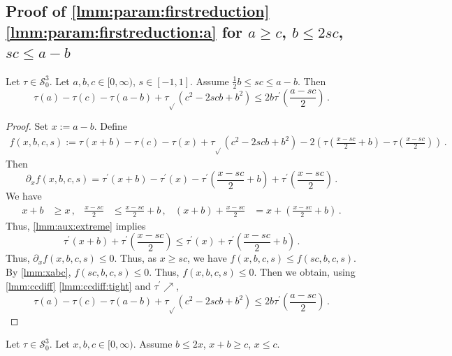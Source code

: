 \documentclass{article}
\newcommand{\lb}{\left(} %
\newcommand{\rb}{\right)} %
\newcommand{\br}[1]{\lb #1 \rb} %
\newcommand{\brOf}[1]{\!\br{#1}} %
\newcommand*{\mc}[1]{\mathcal{#1}}
\newcommand{\Rp}{[0, \infty)} %
\newcommand{\pr}{^\prime}
\newcommand{\equationFullstop}{\, .}
\newcommand{\eqfs}{\equationFullstop}
\newcommand{\equationComma}{\, ,}
\newcommand{\eqcm}{\equationComma}
\newcommand{\tran}{\tau}
\newcommand{\trans}{\tran_{\!\sqrt{}}}
\newcommand{\dtran}{\tran\pr}
\newcommand{\setccod}[1]{\mc S_0^{#1}}
\newcommand{\incr}{\nearrow}
\begin{document}
\begin{appendix}
\subsection{Proof of \cref{lmm:param:firstreduction} \ref{lmm:param:firstreduction:a} for $a \geq c$, $b \leq 2sc$, $sc \leq a-b$}\label{ssec:reduicLaGbscbLsc}
%
%
%
\begin{lemma}\label{lmm:param:reduicLaGbscbLsc}
	Let $\tran\in\setccod3$.
	Let $a,b,c\in\Rp$, $s\in[-1,1]$.
	Assume $\frac12 b \leq sc\leq a-b$.
	Then
	\begin{equation*}
		\tran(a) - \tran(c) - \tran(a-b) + \trans(c^2 - 2 s c b + b^2) \leq 2 b \dtran\brOf{\frac{a - s c}2}
		\eqfs
	\end{equation*}
\end{lemma}
%
\begin{proof}
	Set $x:=a-b$.
	Define
	\begin{align*}
		f(x,b,c,s) := 
		\tran(x+b)-\tran(c)-\tran(x)+\trans(c^2 - 2 s c b + b^2) -
		2 \br{
			\tran\brOf{\frac{x - s c}{2} + b}  -  \tran\brOf{\frac{x - s c}{2}}
		}
		\eqfs
	\end{align*}
	Then
	\begin{equation*}
		\partial_x f(x,b,c,s) =
		\dtran(x+b)-\dtran(x)
		- \dtran\brOf{\frac{x - s c}{2} + b}
		+ \dtran\brOf{\frac{x - s c}{2}}
		\eqfs
	\end{equation*}
	We have
	\begin{align*}
		x+b &\geq  x\eqcm&
		\frac{x - s c}{2} &\leq  \frac{x - s c}{2} + b\eqcm&
		(x+b) + \frac{x - s c}{2} &= x +\br{\frac{x - s c}{2} + b}\eqfs
	\end{align*}
	Thus, \cref{lmm:aux:extreme} implies
	\begin{equation*}
		\dtran(x+b)
		+ \dtran\brOf{\frac{x - s c}{2}}
		\leq
		\dtran(x)
		+\dtran\brOf{\frac{x - s c}{2} + b}
		\eqfs
	\end{equation*}
	Thus, $\partial_x f(x,b,c,s) \leq 0$. Thus, as $x \geq sc$, we have $f(x,b,c,s) \leq f(sc, b,c,s)$.
	By \cref{lmm:xabc}, $f(sc, b,c,s) \leq 0$. Thus, $f(x,b,c,s) \leq 0$.
	Then we obtain, using  \cref{lmm:ccdiff} \ref{lmm:ccdiff:tight} and $\dtran\incr$,
	\begin{equation*}
		\tran(a) - \tran(c) - \tran(a-b) + \trans(c^2 - 2 s c b + b^2) \leq 2 b \dtran\brOf{\frac{a - s c}2}
		\eqfs
	\end{equation*}
\end{proof}
%
\begin{lemma}\label{lmm:xabc}
	Let $\tran\in\setccod3$.
	Let $x,b,c\in\Rp$.
	Assume $b \leq 2x$, $x+b \geq c$, $x\leq c$.

\end{lemma}
\end{appendix}
\end{document}
